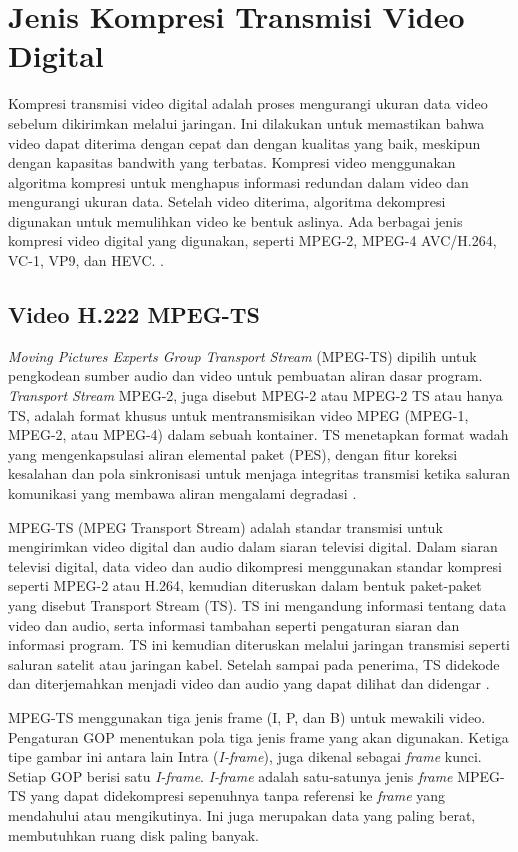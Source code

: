 \section{Jenis Kompresi Transmisi Video Digital}
\hspace{1,2cm}Kompresi transmisi video digital adalah proses mengurangi ukuran data video sebelum dikirimkan melalui jaringan. Ini dilakukan untuk memastikan bahwa video dapat diterima dengan cepat dan dengan kualitas yang baik, meskipun dengan kapasitas bandwith yang terbatas. Kompresi video menggunakan algoritma kompresi untuk menghapus informasi redundan dalam video dan mengurangi ukuran data. Setelah video diterima, algoritma dekompresi digunakan untuk memulihkan video ke bentuk aslinya. Ada berbagai jenis kompresi video digital yang digunakan, seperti MPEG-2, MPEG-4 AVC/H.264, VC-1, VP9, dan HEVC. \citep{Salomon2010}.

\subsection{Video H.222 MPEG-TS}
\hspace{1,2cm}\textit{Moving Pictures Experts Group Transport Stream} (MPEG-TS) dipilih untuk pengkodean sumber audio dan video untuk pembuatan aliran dasar program. \textit{Transport Stream} MPEG-2, juga disebut MPEG-2 atau MPEG-2 TS atau hanya TS, adalah format khusus untuk mentransmisikan video MPEG (MPEG-1, MPEG-2, atau MPEG-4) dalam sebuah kontainer. TS menetapkan format wadah yang mengenkapsulasi aliran elemental paket (PES), dengan fitur koreksi kesalahan dan pola sinkronisasi untuk menjaga integritas transmisi ketika saluran komunikasi yang membawa aliran mengalami degradasi \citep{ISO/IEC2022}.

MPEG-TS (MPEG Transport Stream) adalah standar transmisi untuk mengirimkan video digital dan audio dalam siaran televisi digital. Dalam siaran televisi digital, data video dan audio dikompresi menggunakan standar kompresi seperti MPEG-2 atau H.264, kemudian diteruskan dalam bentuk paket-paket yang disebut Transport Stream (TS). TS ini mengandung informasi tentang data video dan audio, serta informasi tambahan seperti pengaturan siaran dan informasi program. TS ini kemudian diteruskan melalui jaringan transmisi seperti saluran satelit atau jaringan kabel. Setelah sampai pada penerima, TS didekode dan diterjemahkan menjadi video dan audio yang dapat dilihat dan didengar  \citep{Hoelzer2005,ISO/IEC2022}.

MPEG-TS menggunakan tiga jenis frame (I, P, dan B) untuk mewakili video. Pengaturan GOP menentukan pola tiga jenis frame yang akan digunakan. Ketiga tipe gambar ini antara lain Intra (\textit{I-frame}), juga dikenal sebagai \textit{frame} kunci. Setiap GOP berisi satu \textit{I-frame}. \textit{I-frame} adalah satu-satunya jenis \textit{frame} MPEG-TS yang dapat didekompresi sepenuhnya tanpa referensi ke \textit{frame} yang mendahului atau mengikutinya. Ini juga merupakan data yang paling berat, membutuhkan ruang disk paling banyak.

